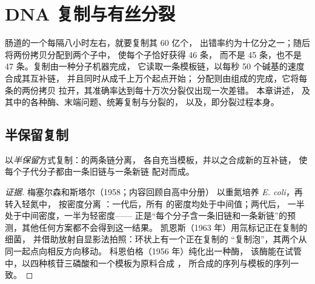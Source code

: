 \chapter{DNA 复制与有丝分裂}\label{ch:b1:replication-mitosis}

肠道的一个每隔八小时左右，就要复制其 60 亿个，
出错率约为十亿分之一；随后将两份拷贝分配到两个子中，
使每个子恰好获得 46 条，
而不是 45 条，也不是 47 条。复制由一种分子机器完成，
它读取一条模板链，以每秒 50 个碱基的速度合成其互补链，
并且同时从成千上万个起点开始；
分配则由组成的完成，它将每条的两份拷贝
拉开，其准确率达到每十万次分裂仅出现一次差错。
本章讲述，
及其中的各种酶、末端问题、统筹复制与分裂的，
以及，即分裂过程本身。

\section{半保留复制}

\begin{proposition}[每条链都充当模板]\label{prop:b1:replication-mitosis:semiconservative}
 以\emph{半保留}方式复制：的两条链分离，
各自充当模板，并以之合成新的互补链，
使每个子代分子都由一条旧链与一条新链
配对而成。
\end{proposition}
\begin{proof}[证据]
梅塞尔森和斯塔尔（1958；内容回顾自高中分册）
以重氮培养 \emph{E. coli}，再转入轻氮中，
按密度分离 ：一代后，所有  的密度均处于中间值；两代后，
一半处于中间密度，一半为轻密度——
正是“每个分子含一条旧链和一条新链”的预测，其他任何方案都不会得到这一结果。
凯恩斯（1963 年）用氚标记正在复制的细菌，
并借助放射自显影法拍照：环状上有一个正在复制的
“复制泡”，其两个从同一起点向相反方向移动。
科恩伯格（1956 年）纯化出一种酶，
该酶能在试管中，以四种核苷三磷酸和一个模板为原料合成 ，
所合成的序列与模板的序列一致。
\end{proof}

